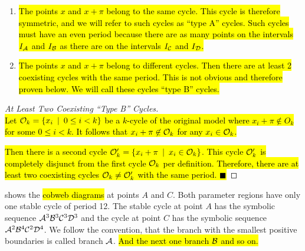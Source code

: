\begin{enumerate}[label=(\Alph*)]
	\item
	      \hl{
		      The points $x$ and $x + \pi$ belong to the same cycle.
		      This cycle is therefore symmetric, and we will refer to such cycles as ``type A'' cycles.
		      Such cycles must have an even period because there are as many points on the intervals $I_{\mathcal{A}}$ and $I_{\mathcal{B}}$ as there are on the intervals $I_{\mathcal{C}}$ and $I_{\mathcal{D}}$.
	      }
	\item
	      \hl{
		      The points $x$ and $x + \pi$ belong to different cycles.
		      Then there are at least 2 coexisting cycles with the same period.
		      This is not obvious and therefore proven below. %
		      We will call these cycles ``type B'' cycles.
	      }
\end{enumerate}

\begin{proof}[At Least Two Coexisting ``Type B'' Cycles] \phantom{x} \\
	\hl{
		Let $\mathcal{O}_k = \left\{x_i \:\mid\: 0 \leq i < k\right\}$ be a $k$-cycle of the original model where $x_i + \pi \not\in O_k$ for some $0 \leq i < k$.
		It follows that $x_i + \pi \not\in \mathcal{O}_k$ for any $x_i \in \mathcal{O}_k$.
	}

	\hl{
		Then there is a second cycle $\mathcal{O}'_k = \left\{x_i + \pi \:\mid\: x_i \in \mathcal{O}_k\right\}$.
		This cycle $\mathcal{O}'_k$ is completely disjunct from the first cycle $\mathcal{O}_k$ per definition.
		Therefore, there are at least two coexisting cycles $\mathcal{O}_k \neq \mathcal{O}'_k$ with the same period. \hfill	$\blacksquare$
	}
\end{proof}

 shows the \hl{cobweb diagrams} at points $A$ and $C$.
Both parameter regions have only one stable cycle of period 12.
The stable cycle at point $A$ has the symbolic sequence $\mathcal{A}^3\mathcal{B}^3\mathcal{C}^3\mathcal{D}^3$ and the cycle at point $C$ has the symbolic sequence $\mathcal{A}^2\mathcal{B}^4\mathcal{C}^2\mathcal{D}^4$.
We follow the convention, that the branch with the smallest positive boundaries is called branch $\mathcal{A}$.
\hl{And the next one branch $\mathcal{B}$ and so on.}

